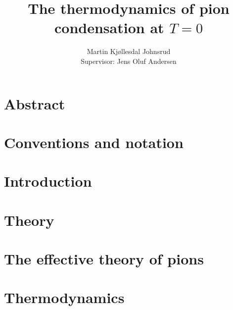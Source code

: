 \documentclass{book}
\title{\huge{The thermodynamics of pion condensation at $T=0$}}
\author{
    \large{Martin Kjøllesdal Johnsrud }\\
    \normalsize{Supervisor: Jens Oluf Andersen}
    }
\begin{document}
\maketitle 

\makeatletter\@openrightfalse
\chapter*{Abstract}


\chapter*{Conventions and notation}

\newpage

\@openrighttrue\makeatother
\tableofcontents %
\listoftodos


\chapter{Introduction}



\chapter{Theory}
\label{chapter:theory}






\chapter{The effective theory of pions}
\label{chapter:effective theory of pions}








\chapter{Thermodynamics}
\label{chapter:thermodynamics}





\end{document}
